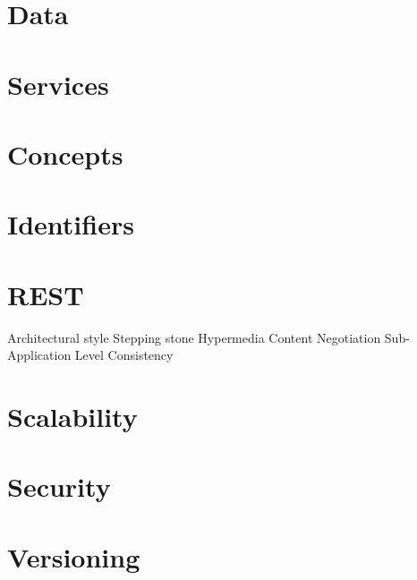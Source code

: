 \section{Data}

\section{Services}

\section{Concepts}

\section{Identifiers}

\section{REST}
Architectural style
Stepping stone
Hypermedia
Content Negotiation
Sub-Application Level Consistency

\section{Scalability}

\section{Security}

\section{Versioning}